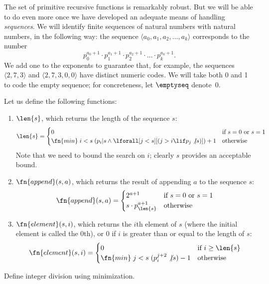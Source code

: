 \documentclass[../../include/open-logic-section]{subfiles}
\begin{document}

The set of primitive recursive functions is
remarkably robust. But we will be able to do even more once we have
developed an adequate means of handling \emph{sequences}.  We will
identify finite sequences of natural numbers with natural numbers, in
the following way: the sequence $\langle a_0, a_1, a_2, \dots, a_k \rangle$
corresponds to the number
\[
p_0^{a_0+1} \cdot p_1^{a_1+1} \cdot p_2^{a_2+1} \cdot \dots \cdot
p_k^{a_k+1}.
\]
We add one to the exponents to guarantee that, for example,
the sequences $\langle 2, 7, 3\rangle$ and $\langle 2, 7, 3, 0, 0 \rangle$ have
distinct numeric codes. We will take both 0 and 1 to code the empty
sequence; for concreteness, let $\emptyseq$ denote~$0$.

Let us define the following functions:
\begin{enumerate}
\item $\len{s}$, which returns the length of the sequence $s$:
\[
\len{s} = 
\begin{cases} 
0 & \text{if $s = 0$ or $s = 1$} \\
\fn{min} \; i < s \; (p_i | s \land \lforall[j < s][(j > i \lif
    p_j \not | s)])+1 & \text{otherwise}
\end{cases}
\]
Note that we need to bound the search on $i$; clearly $s$ provides an
acceptable bound.

\item $\fn{append}(s,a)$, which returns the result of appending $a$ to
  the sequence $s$:
\[
\fn{append}(s,a) = 
\begin{cases}
  2^{a+1} & \text{if $s = 0$ or $s = 1$} \\
s \cdot p_{\len{s}}^{a+1} & \text{otherwise}
\end{cases}
\]
\item $\fn{element}(s,i)$, which returns the $i$th element of $s$
  (where the initial element is called the $0$th), or $0$ if $i$ is
  greater than or equal to the length of $s$:
\[
\fn{element}(s,i) = 
\begin{cases}
  0 & \mbox{if $i \geq \len{s}$} \\
  \fn{min} \; {j < s} \; (p_i^{j+2} \not | s) - 1 & \text{otherwise}
\end{cases}
\]
\end{enumerate}

\begin{prob}
Define integer division using minimization.
\end{prob}
\end{document}
